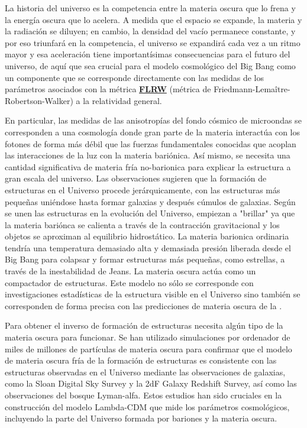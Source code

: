 La historia del universo es la competencia entre la materia oscura que lo frena y la energía oscura que lo acelera. A medida que el espacio se expande, la materia y la radiación se diluyen; en cambio, la densidad del vacío permanece constante, y por eso triunfará en la competencia, el universo se expandirá cada vez a un ritmo mayor y esa aceleración tiene importantísimas consecuencias para el futuro del universo, de aquí que sea crucial para el modelo cosmológico del Big Bang como un componente que se corresponde directamente con las medidas de los parámetros asociados con la métrica \href{https://es.wikipedia.org/wiki/M\%C3\%A9trica_de_Friedman-Lema\%C3\%AEtre-Robertson-Walker}{\textbf{FLRW}} (métrica de Friedmann-Lemaître-Robertson-Walker) a la relatividad general. 

En particular, las medidas de las anisotropías del fondo cósmico de microondas se corresponden a una cosmología donde gran parte de la materia interactúa con los fotones de forma más débil que las fuerzas fundamentales conocidas que acoplan las interacciones de la luz con la materia bariónica. Así mismo, se necesita una cantidad significativa de materia fría no-barionica para explicar la estructura a gran escala del universo. Las observaciones sugieren que la formación de estructuras en el Universo procede jerárquicamente, con las estructuras más pequeñas uniéndose hasta formar galaxias y después cúmulos de galaxias. Según se unen las estructuras en la evolución del Universo, empiezan a "brillar" ya que la materia bariónca se calienta a través de la contracción gravitacional y los objetos se aproximan al equilibrio hidrostático. La materia barionica ordinaria tendría una temperatura demasiado alta y demasiada presión liberada desde el Big Bang para colapsar y formar estructuras más pequeñas, como estrellas, a través de la inestabilidad de Jeans. La materia oscura actúa como un compactador de estructuras. Este modelo no sólo se corresponde con investigaciones estadísticas de la estructura visible en el Universo sino también se corresponden de forma precisa con las predicciones de materia oscura de la \WMAP.

Para obtener el inverso de formación de estructuras necesita algún tipo de la materia oscura para funcionar. Se han utilizado simulaciones por ordenador de miles de millones de partículas de materia oscura para confirmar que el modelo de materia oscura fría de la formación de estructuras es consistente con las estructuras observadas en el Universo mediante las observaciones de galaxias, como la Sloan Digital Sky Survey y la 2dF Galaxy Redshift Survey, así como las observaciones del bosque Lyman-alfa. Estos estudios han sido cruciales en la construcción del modelo Lambda-CDM que mide los parámetros cosmológicos, incluyendo la parte del Universo formada por bariones y la materia oscura.













